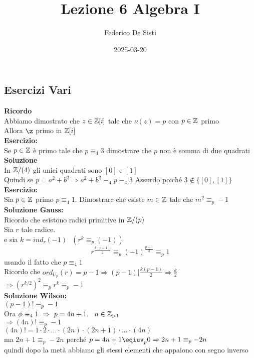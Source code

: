 \documentclass[12px]{article}
\title{Lezione 6 Algebra I}
\date{2025-03-20}
\author{Federico De Sisti}
\begin{document}
	\maketitle
	\newpage
	\subsection{Esercizi Vari}
	\textbf{Ricordo}\\
	Abbiamo dimostrato che $z\in\mathbb{Z}[i]$ tale che $\nu(z) = p$ con  $p\in\mathbb{Z}$ primo\\
	Allora $\z$ primo in $\mathbb{Z}[i]$\\
	\textbf{Esercizio:}\\
	Se $p\in\mathbb{Z}$ è primo tale che  $p \equiv_4 3$ dimostrare che  $p$ non è somma di due quadrati\\
	\textbf{Soluzione}\\
	In $\mathbb{Z}/(4)$ gli unici quadrati sono  $[0]$ e $[1]$\\
Quindi se  $p = a^2 + b^2 \Rightarrow a^2 + b^2 \equiv_4 p\equiv_4 3$ Assurdo poiché $3\not\in \{[0],[1]\}$\\
\textbf{Esercizio:}\\
Sia  $p\in \mathbb{Z}$ primo  $p\equiv_4 1$. Dimostrare che esiste  $m\in\mathbb{Z}$ tale che $m^2\equiv_p -1$\\
 \textbf{Soluzione Gauss:}\\
 Ricordo che esistono radici primitive in $\mathbb{Z}/(p)$\\
 Sia $r$ tale radice.\\
 e sia  $k = ind_r(-1)\ \ \ (r^k\equiv_p (-1))$ \\
\[r^{\frac{k(p-1)}2} \equiv_p (-1)^{\frac{p-1}2}\equiv_p 1\]
usando il fatto che $p\equiv_4 1$ \\
Ricordo che $ord_{U_p}(r) = p-1 \Rightarrow (p-1)|\frac{k(p-1)}2 \Rightarrow \frac{k}2$ \\
$ \Rightarrow (r^{k/2})^2\equiv_p r^k \equiv_p -1$\\
\textbf{Soluzione Wilson:}\\
$(p-1)!\equiv_p -1$\\
Ora  $\phi\equiv_4 1 \ \Rightarrow  \ p = 4n + 1, \ \ n\in\mathbb{Z}_{>1}$ \\
$ \Rightarrow (4n)!\equiv_p -1$ \\
$(4n)! = 1\cdot 2\cdot\ldots\cdot (2n)\cdot (2n+1)\cdot\ldots\cdot (4n)$\\
ma $2n + 1 \equiv_p -2n $ perché $p = 4n + 1 \eqiuv_p 0 \Rightarrow 2n+ 1\equiv_p -2n $ \\
quindi dopo la metà abbiamo gli stessi elementi che appaiono con segno inverso\\
\end{document}

